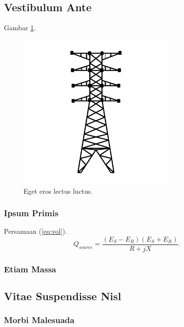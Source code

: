 \subsection{Vestibulum Ante}
\lipsum[91] Gambar \ref{fig:ros}.
\begin{figure}[!h]
	\vspace*{0pt}
	\centering
	\includegraphics[width=0.7\textwidth]{fig/wiregrid}
	\caption{Eget eros lectus luctus.}
	\label{fig:ros}
\end{figure}
\subsubsection{Ipsum Primis}
\lipsum[81] Persamaan (\ref{eq:vol}).
\begin{equation}\label{eq:vol}
Q_{source} = \dfrac{(E_S - E_R)(E_S + E_R)}{R+jX}.
\end{equation}
\subsubsection{Etiam Massa}
\lipsum[27]
\subsection{Vitae Suspendisse Nisl}
\lipsum[91-92] 
\subsubsection{Morbi Malesuada}
\lipsum[80]
